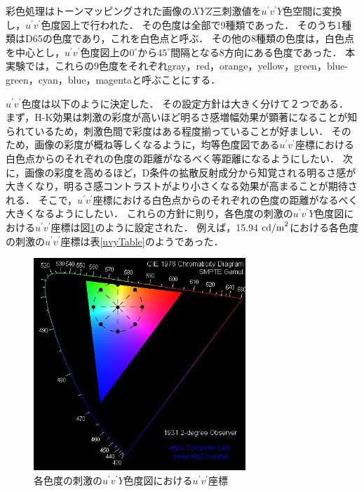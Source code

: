                 彩色処理はトーンマッピングされた画像の$XYZ$三刺激値を$u^{\prime}v^{\prime}Y$色空間に変換し，$u^{\prime}v^{\prime}$色度図上で行われた．
                その色度は全部で9種類であった．
                そのうち1種類はD65の色度であり，これを白色点と呼ぶ．
                その他の8種類の色度は，白色点を中心とし，$u^{\prime}v^{\prime}$色度図上の$0^{\circ}$から$45^{\circ}$間隔となる8方向にある色度であった．
                本実験では，これらの9色度をそれぞれgray，red，orange，yellow，green，blue-green，cyan，blue，magentaと呼ぶことにする．

                $u^{\prime}v^{\prime}$色度は以下のように決定した．
                その設定方針は大きく分けて２つである．
                まず，H-K効果は刺激の彩度が高いほど明るさ感増幅効果が顕著になることが知られているため，刺激色間で彩度はある程度揃っていることが好ましい．
                そのため，画像の彩度が概ね等しくなるように，均等色度図である$u^{\prime}v^{\prime}$座標における白色点からのそれぞれの色度の距離がなるべく等距離になるようにしたい．
                次に，画像の彩度を高めるほど，D条件の拡散反射成分から知覚される明るさ感が大きくなり，明るさ感コントラストがより小さくなる効果が高まることが期待される．
                そこで，$u^{\prime}v^{\prime}$座標における白色点からのそれぞれの色度の距離がなるべく大きくなるようにしたい．
                これらの方針に則り，各色度の刺激の$u^{\prime}v^{\prime}Y$色度図における$u^{\prime}v^{\prime}$座標は図\ref{uvy}のように設定された\cite{uvYimage}．
                例えば，15.94 ${\rm cd/m}^2$における各色度の刺激の$u^{\prime}v^{\prime}$座標は表\ref{uvyTable}のようであった．

                \begin{figure}[h]
                    \centering
                    \includegraphics[width=8.0cm]{./img/CIE1976.jpg}
                    \caption{各色度の刺激の$u^{\prime}v^{\prime}Y$色度図における$u^{\prime}v^{\prime}$座標}
                    \label{uvy}
                \end{figure}

